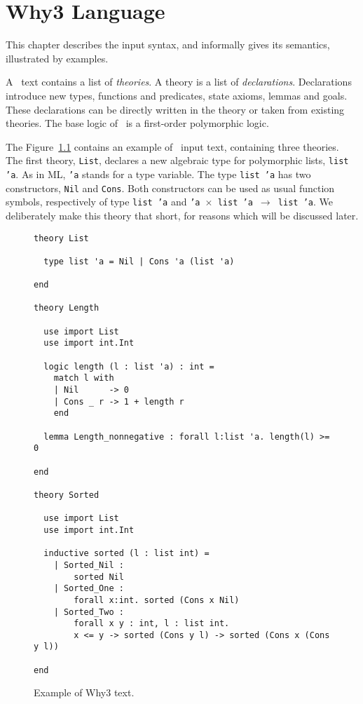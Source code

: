 \chapter{Why3 Language}
\label{chap:syntax}

This chapter describes the input syntax, and informally gives its semantics,
illustrated by examples.

A \why\ text contains a list of \emph{theories}. 
A theory is a list of \emph{declarations}. Declarations introduce new
types, functions and predicates, state axioms, lemmas and goals. 
These declarations can be directly written in the theory or taken from
existing theories. The base logic of \why\ is a first-order
polymorphic logic.

The Figure~\ref{fig:tutorial1} contains an example of \why\ input
text, containing three theories. The first theory, \texttt{List}, 
declares a new algebraic type for polymorphic lists, \texttt{list 'a}.
As in ML, \texttt{'a} stands for a type variable.
The type \texttt{list 'a} has two constructors, \texttt{Nil} and
\texttt{Cons}. Both constructors can be used as usual function
symbols, respectively of type \texttt{list 'a} and \texttt{'a
  $\times$ list 'a $\rightarrow$ list 'a}.
We deliberately make this theory that short, for reasons which will be
discussed later.

\begin{figure}
  \centering
\begin{verbatim}
theory List

  type list 'a = Nil | Cons 'a (list 'a)

end

theory Length

  use import List
  use import int.Int

  logic length (l : list 'a) : int = 
    match l with
    | Nil      -> 0
    | Cons _ r -> 1 + length r
    end

  lemma Length_nonnegative : forall l:list 'a. length(l) >= 0

end

theory Sorted

  use import List
  use import int.Int
 
  inductive sorted (l : list int) =
    | Sorted_Nil : 
        sorted Nil
    | Sorted_One : 
        forall x:int. sorted (Cons x Nil)
    | Sorted_Two : 
        forall x y : int, l : list int. 
        x <= y -> sorted (Cons y l) -> sorted (Cons x (Cons y l))
 
end
\end{verbatim}
\caption{Example of Why3 text.}
\label{fig:tutorial1}
\end{figure}

